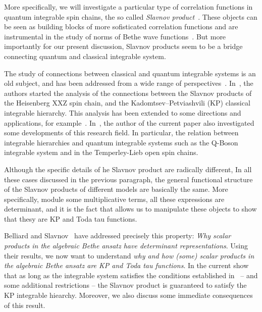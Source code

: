 \documentclass[a4paper,12pt]{amsart}
\begin{document}
More specifically, we will investigate a particular type of
correlation functions in quantum integrable spin chains, the so called
\emph{Slavnov product}~\cite{Slavnov1989}. These objects can be seen as building blocks
of more sofisticated correlation functions and are instrumental in the
study of norms of Bethe wave functions~\cite{Korepin:1993kvr}.  But
more importantly for our present discussion, Slavnov products seem to
be a bridge connecting quantum and classical integrable system.

The study of connections between classical and quantum integrable
systems is an old subject, and has been addressed from a wide range of
perspectives~\cite{Wu:1975mw, Its:1992bj, korepin2000the, Foda2009,
  Alexandrov:2011aa}.  In~\cite{Foda:2009zz}, the authors started the
analysis of the connections between the Slavnov products of the
Heisenberg XXZ spin chain, and the Kadomtsev–Petviashvili (KP)
classical integrable hierarchy. This analysis has been extended to
some directions and applications, for example~\cite{Wheeler:2010vmq,
  Foda:2010, Takasaki:2010qm, Foda:2012wn, Foda:2012wf}.
In~\cite{Araujo:2021ghu, Araujo:2024klz}, the author of the current
paper also investigated some developments of this research field. In
particular, the relation between integrable hierarchies and quantum
integrable systems such as the Q-Boson integrable system and in the
Temperley-Lieb open spin chains.

Although the specific details of he Slavnov product are radically
different, In all these cases discussed in the previous paragraph, the
general functional structure of the Slavnov products of different
models are basically the same. More specifically, module some
multiplicative terms, all these expressions are determinant, and it is
the fact that allows us to manipulate these objects to show that thesy
are KP and Toda tau functions.

Belliard and Slavnov~\cite{Belliard:2019bfz} have addressed precisely
this property: \emph{Why scalar products in the algebraic Bethe ansatz
have determinant representations}.  Using their results, we now want
to understand \emph{why and how (some) scalar products in the
algebraic Bethe ansatz are KP and Toda tau functions}. In the current
show that as long as the integrable system satisfies the conditions
established in~\cite{Belliard:2019bfz} -- and some additional
restrictions -- the Slavnov product is guaranteed to satisfy the KP
integrable hiearchy. Moreover, we also discuss some immediate
consequences of this result.
\end{document}
